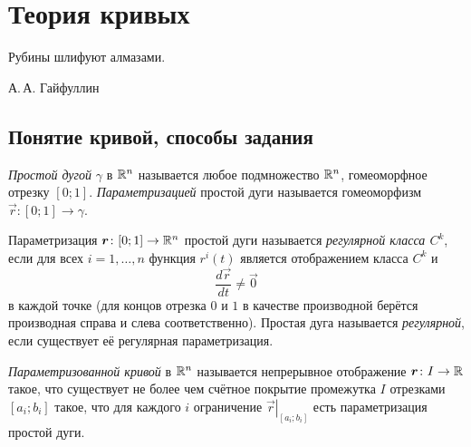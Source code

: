 \section{Теория кривых}

\epigraph{Рубины шлифуют алмазами.}{А.\,А. Гайфуллин}

\subsection{Понятие кривой, способы задания}

\begin{definition}
	\textit{Простой дугой} $\gamma$ в $\mathbb{R}^n$ называется любое подмножество $\mathbb{R}^n$, гомеоморфное отрезку $[0; 1]$. \textit{Параметризацией} простой дуги называется гомеоморфизм $\vec{r}\colon [0; 1] \to \gamma$.
\end{definition}

\begin{definition}
	Параметризация $\boldsymbol{r}\colon [0; 1] \to \mathbb{R}^n$ простой дуги называется \textit{регулярной класса $C^k$}, если для всех $i = 1, \ldots, n$ функция $r^i(t)$ является отображением класса $C^k$ и
	\[
		\frac{d\vec{r}}{dt} \ne \vec{0}
	\]
	в каждой точке (для концов отрезка $0$ и $1$ в качестве производной берётся производная справа и слева соответственно). Простая дуга называется \textit{регулярной}, если существует её регулярная параметризация.
\end{definition}


\begin{definition}
	\textit{Параметризованной кривой} в $\mathbb{R}^n$ называется непрерывное отображение $\boldsymbol{r}\colon I \to \mathbb{R}$ такое, что существует не более чем счётное покрытие промежутка $I$ отрезками $[a_i; b_i]$ такое, что для каждого $i$ ограничение $\left.\vec{r}\right|_{[a_i; b_i]}$ есть параметризация простой дуги.
\end{definition}

